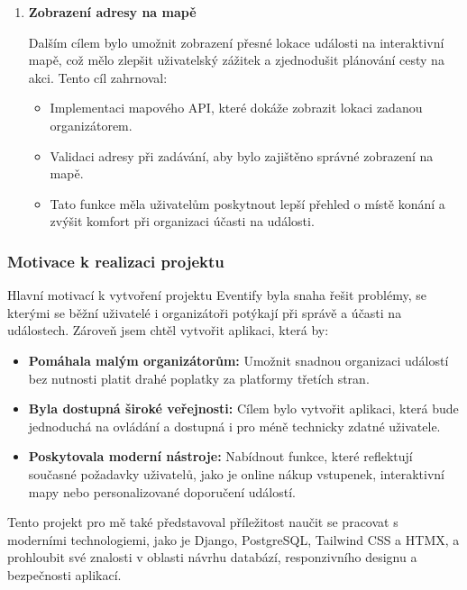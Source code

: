 \documentclass[12pt, a4paper,
twoside,        %
openright
]{report}
\begin{document}
\begin{enumerate}
\begin{itemize}
\end{itemize}

\item \textbf{Zobrazení adresy na mapě}

Dalším cílem bylo umožnit zobrazení přesné lokace události na interaktivní mapě, což mělo zlepšit uživatelský zážitek a zjednodušit plánování cesty na akci. Tento cíl zahrnoval:

\begin{itemize}
	
\item Implementaci mapového API, které dokáže zobrazit lokaci zadanou organizátorem.
\item Validaci adresy při zadávání, aby bylo zajištěno správné zobrazení na mapě.
\item Tato funkce měla uživatelům poskytnout lepší přehled o místě konání a zvýšit komfort při organizaci účasti na události.

\end{itemize}

\end{enumerate}

\subsubsection{Motivace k realizaci projektu}

Hlavní motivací k vytvoření projektu Eventify byla snaha řešit problémy, se kterými se běžní uživatelé i organizátoři potýkají při správě a účasti na událostech. Zároveň jsem chtěl vytvořit aplikaci, která by:

\begin{itemize}
	
\item \textbf{Pomáhala malým organizátorům:} Umožnit snadnou organizaci událostí bez nutnosti platit drahé poplatky za platformy třetích stran.
\item \textbf{Byla dostupná široké veřejnosti:} Cílem bylo vytvořit aplikaci, která bude jednoduchá na ovládání a dostupná i pro méně technicky zdatné uživatele.
\item \textbf{Poskytovala moderní nástroje:} Nabídnout funkce, které reflektují současné požadavky uživatelů, jako je online nákup vstupenek, interaktivní mapy nebo personalizované doporučení událostí.

\end{itemize}

Tento projekt pro mě také představoval příležitost naučit se pracovat s moderními technologiemi, jako je Django, PostgreSQL, Tailwind CSS a HTMX, a prohloubit své znalosti v oblasti návrhu databází, responzivního designu a bezpečnosti aplikací.
\end{document}
